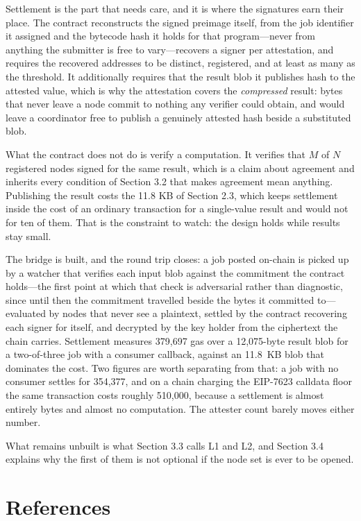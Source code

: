 \documentclass[12pt,a4paper]{article}
\begin{document}
Settlement is the part that needs care, and it is where the signatures earn their place.
The contract reconstructs the signed preimage itself, from the job identifier it assigned and the bytecode hash it holds for that program---never from anything the submitter is free to vary---recovers a signer per attestation, and requires the recovered addresses to be distinct, registered, and at least as many as the threshold.
It additionally requires that the result blob it publishes hash to the attested value, which is why the attestation covers the \emph{compressed} result: bytes that never leave a node commit to nothing any verifier could obtain, and would leave a coordinator free to publish a genuinely attested hash beside a substituted blob.

What the contract does not do is verify a computation.
It verifies that $M$ of $N$ registered nodes signed for the same result, which is a claim about agreement and inherits every condition of Section 3.2 that makes agreement mean anything.
Publishing the result costs the 11.8 KB of Section 2.3, which keeps settlement inside the cost of an ordinary transaction for a single-value result and would not for ten of them.
That is the constraint to watch: the design holds while results stay small.

The bridge is built, and the round trip closes: a job posted on-chain is picked up by a watcher that verifies each input blob against the commitment the contract holds---the first point at which that check is adversarial rather than diagnostic, since until then the commitment travelled beside the bytes it committed to---evaluated by nodes that never see a plaintext, settled by the contract recovering each signer for itself, and decrypted by the key holder from the ciphertext the chain carries.
Settlement measures 379{,}697 gas over a 12{,}075-byte result blob for a two-of-three job with a consumer callback, against an 11.8~KB blob that dominates the cost.
Two figures are worth separating from that: a job with no consumer settles for 354{,}377, and on a chain charging the EIP-7623 calldata floor the same transaction costs roughly 510{,}000, because a settlement is almost entirely bytes and almost no computation.
The attester count barely moves either number.

What remains unbuilt is what Section 3.3 calls L1 and L2, and Section 3.4 explains why the first of them is not optional if the node set is ever to be opened.

\section{References}


\end{document}
